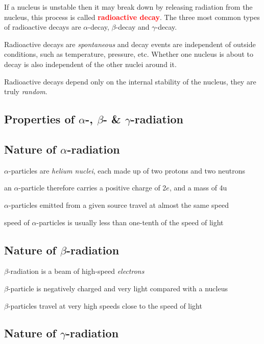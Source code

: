 \documentclass[a4paper,12pt]{book}
\newcommand{\keypoint}[1]{\textbf{\textcolor{red}{#1}}}
\newcommand{\keypoint}[1]{\textbf{\textcolor{red}{#1}}}
\begin{document}
If a nucleus is unstable then it may break down by releasing radiation from the nucleus, this process is called \keypoint{radioactive decay}. The three most common types of radioactive decays are $\alpha$-decay, $\beta$-decay and $\gamma$-decay. 

Radioactive decays are \emph{spontaneous} and decay events are independent of outside conditions, such as temperature, pressure, etc. Whether one nucleus is about to decay is also independent of the other nuclei around it. 

Radioactive decays depend only on the internal stability of the nucleus, they are truly \emph{random}. 

\subsection{Properties of $\alpha$-, $\beta$- \& $\gamma$-radiation}

\subsection*{Nature of \texorpdfstring{$\alpha$}{\textalpha}-radiation}

$\alpha$-particles are \emph{helium nuclei}, each made up of two protons and two neutrons

an $\alpha$-particle therefore carries a positive charge of 2$e$, and a mass of 4u

$\alpha$-particles emitted from a given source travel at almost the same speed

speed of $\alpha$-particles is usually less than one-tenth of the speed of light

\subsection*{Nature of \texorpdfstring{$\beta$}{\textbeta}-radiation}

$\beta$-radiation is a beam of high-speed \emph{electrons}

$\beta$-particle is negatively charged and very light compared with a nucleus

$\beta$-particles travel at very high speeds close to the speed of light

\subsection*{Nature of \texorpdfstring{$\gamma$}{\textgamma}-radiation}
\end{document}
